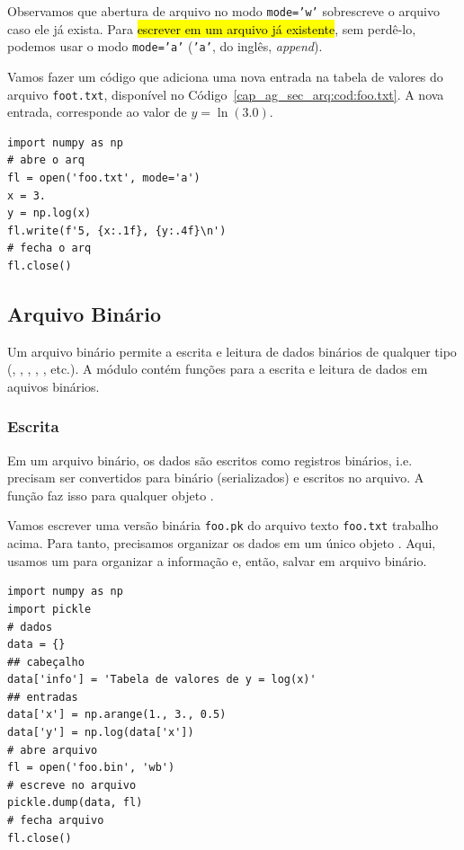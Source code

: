 Observamos que abertura de arquivo no modo \texttt{mode='w'} sobrescreve o arquivo caso ele já exista. Para \hl{escrever em um arquivo já existente}, sem perdê-lo, podemos usar o modo \texttt{mode='a'} (\texttt{'a'}, do inglês, \textit{append}).

\begin{ex}
  Vamos fazer um código que adiciona uma nova entrada na tabela de valores do arquivo \texttt{foot.txt}, disponível no Código~\ref{cap_ag_sec_arq:cod:foo.txt}. A nova entrada, corresponde ao valor de $y = \ln(3.0)$.

\begin{lstlisting}
import numpy as np
# abre o arq
fl = open('foo.txt', mode='a')
x = 3.
y = np.log(x)
fl.write(f'5, {x:.1f}, {y:.4f}\n')
# fecha o arq
fl.close()
\end{lstlisting}

\end{ex}

\subsection{Arquivo Binário}\label{cap_ag_sec_arq:ssec:arqbin}

Um arquivo binário permite a escrita e leitura de dados binários de qualquer tipo ({\PYTHONint}, {\PYTHONfloat}, {\PYTHONstr}, {\PYTHONtuple}, {\PYTHONlist}, etc.). A módulo {\PYTHONpickle} contém funções para a escrita e leitura de dados em aquivos binários.

\subsubsection{Escrita}

Em um arquivo binário, os dados são escritos como registros binários, i.e. precisam ser convertidos para binário (serializados) e escritos no arquivo. A função {\PYTHONpickleDOTdump} faz isso para qualquer objeto {\python}.

\begin{ex}
  Vamos escrever uma versão binária \lstinline+foo.pk+ do arquivo texto \texttt{foo.txt} trabalho acima. Para tanto, precisamos organizar os dados em um único objeto {\python}. Aqui, usamos um {\PYTHONdict} para organizar a informação e, então, salvar em arquivo binário.

\begin{lstlisting}[caption=foo.bin, label=cap_ag_sec_arq:cod:foo.bin]
import numpy as np
import pickle
# dados
data = {}
## cabeçalho
data['info'] = 'Tabela de valores de y = log(x)'
## entradas
data['x'] = np.arange(1., 3., 0.5)
data['y'] = np.log(data['x'])
# abre arquivo
fl = open('foo.bin', 'wb')
# escreve no arquivo
pickle.dump(data, fl)
# fecha arquivo
fl.close()
\end{lstlisting}

\end{ex}

